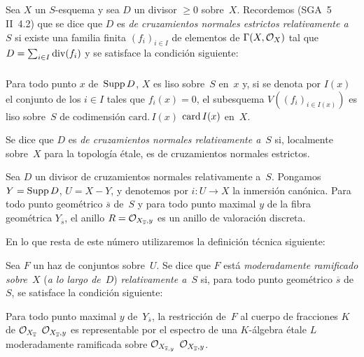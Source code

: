 
\begingroup
\shorthandoff{<>}%
\subsection{}
\label{XIII.2.1}
Sea
$X$ un $S$-esquema y sea $D$ un divisor $\geq 0$ sobre~$X$. Recordemos
(SGA~5 II~4.2) que se dice que $D$ es \emph{de cruzamientos normales
estrictos relativamente a}~$S$
%
%
%
si existe una familia finita $(f_i)_{i\in I}$ de elementos de
$\Gamma(X,\cal{O}_X)$ tal que $D=\sum_{i\in I}\divisor(f_i)$ y se satisface
la condición siguiente:

\setcounter{subsubsection}{-1}
\subsubsection{}
\label{XIII.2.1.0}
Para todo punto $x$ de~$\Supp D$, $X$ es liso sobre~$S$ en~$x$ y, si se
denota por $I(x)$ el conjunto de los $i\in I$ tales que $f_i(x)=0$, el
subesquema $V((f_i)_{i\in I(x)})$ es liso sobre~$S$ de codimensión
{$\mathrm{card}.\,I(x)$}
{$\card I(x)$}
en~$X$.

Se dice que $D$ es \emph{de cruzamientos normales relativamente a}~$S$ si,
localmente sobre~$X$ para la topología étale, es de cruzamientos normales
estrictos.

Sea $D$ un divisor de cruzamientos normales relativamente a~$S$. Pongamos
$Y=\Supp D$, $U=X-Y$, y denotemos por $i\colon U\to X$ la inmersión
canónica. Para todo punto geométrico $\overline{s}$ de~$S$ y para todo punto
maximal $y$ de la fibra geométrica $Y_{\overline{s}}$, el anillo
$R=\cal{O}_{X_{\overline{s}},y}$ es un anillo de valoración discreta.

En lo que resta de este número utilizaremos la definición técnica siguiente:

\begin{subdefinition}
\label{XIII.2.1.1}
Sea $F$ un haz de conjuntos sobre~$U$. Se dice que $F$ está
\emph{moderadamente ramificado sobre}~$X$
%
(\emph{a lo largo de}~$D$) \emph{relativamente a}~$S$ si, para todo punto
geométrico $\overline{s}$ de~$S$, se satisface la condición siguiente:

Para todo punto maximal $y$ de~$Y_{\overline{s}}$, la restricción de~$F$ al
cuerpo de fracciones $K$ de
{$\cal{O}_{X_{\overline{s}}}$}
{$\cal{O}_{X_{\overline{s}},y}$}
es representable por el espectro de una $K$-álgebra étale $L$ moderadamente
ramificada sobre
{$\cal{O}_{X_{\overline{s},y}}$}
{$\cal{O}_{X_{\overline{s}},y}$}.
\end{subdefinition}


